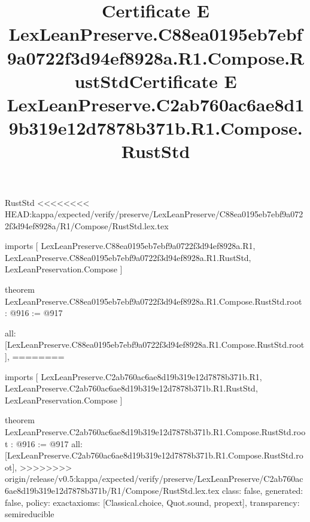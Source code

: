 \begin{lexlean}{RustStd}
<<<<<<<< HEAD:kappa/expected/verify/preserve/LexLeanPreserve/C88ea0195eb7ebf9a0722f3d94ef8928a/R1/Compose/RustStd.lex.tex
\title{Certificate E LexLeanPreserve.C88ea0195eb7ebf9a0722f3d94ef8928a.R1.Compose.RustStd}
\begin{coremodule}
imports [
  LexLeanPreserve.C88ea0195eb7ebf9a0722f3d94ef8928a.R1,
  LexLeanPreserve.C88ea0195eb7ebf9a0722f3d94ef8928a.R1.RustStd,
  LexLeanPreservation.Compose
]

theorem LexLeanPreserve.C88ea0195eb7ebf9a0722f3d94ef8928a.R1.Compose.RustStd.root : @916 := @917 {
  all: [LexLeanPreserve.C88ea0195eb7ebf9a0722f3d94ef8928a.R1.Compose.RustStd.root],
========
\title{Certificate E LexLeanPreserve.C2ab760ac6ae8d19b319e12d7878b371b.R1.Compose.RustStd}
\begin{coremodule}
imports [
  LexLeanPreserve.C2ab760ac6ae8d19b319e12d7878b371b.R1,
  LexLeanPreserve.C2ab760ac6ae8d19b319e12d7878b371b.R1.RustStd,
  LexLeanPreservation.Compose
]

theorem LexLeanPreserve.C2ab760ac6ae8d19b319e12d7878b371b.R1.Compose.RustStd.root : @916 := @917 {
  all: [LexLeanPreserve.C2ab760ac6ae8d19b319e12d7878b371b.R1.Compose.RustStd.root],
>>>>>>>> origin/release/v0.5:kappa/expected/verify/preserve/LexLeanPreserve/C2ab760ac6ae8d19b319e12d7878b371b/R1/Compose/RustStd.lex.tex
  class: false,
  generated: false,
  policy: exact{axioms: [Classical.choice, Quot.sound, propext]},
  transparency: semireducible
}


\end{coremodule}}
\end{coremodule}
\end{lexlean}
